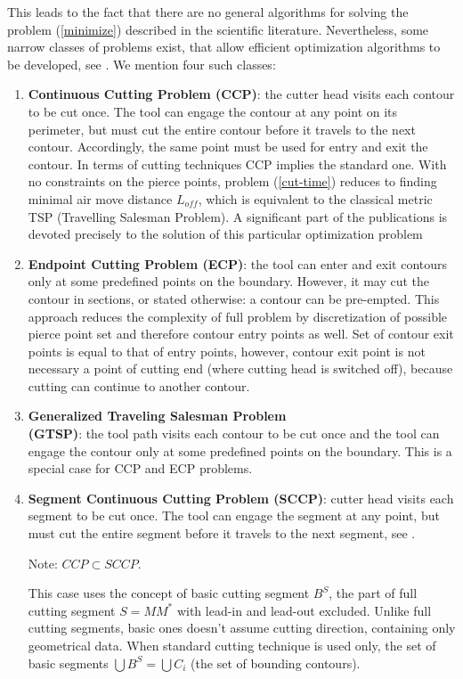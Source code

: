 \documentclass{ifacconf}
\begin{document}
This leads to the fact that
there are no general algorithms for solving the problem
(\ref{minimize})
described in the scientific literature.
Nevertheless,
some narrow classes of problems
exist,
that allow efficient optimization algorithms to be developed,
see \cite{dewil2012heuristics}.
We mention four such classes:

\begin{enumerate}
    \item \textbf{Continuous Cutting Problem (CCP)}:
    the cutter head visits each contour to be cut once.
    The tool can engage the contour at any point on its perimeter,
    but must cut the entire
    contour before it travels to the next contour.
    Accordingly, the same point must be used for
    entry and exit the contour.
    In terms of cutting techniques CCP implies the standard one.
    With no constraints on the pierce points,
    problem (\ref{cut-time}) reduces to finding minimal
    air move distance $L_{off}$,
    which is equivalent to the classical metric TSP
    (Travelling Salesman Problem).
    A significant part of the publications is devoted precisely
    to the solution of this particular optimization problem

    \item \textbf{Endpoint Cutting Problem (ECP)}:
    the tool can enter and exit contours only at some
    predefined points on the boundary.
    However, it may cut the contour in sections,
    or stated otherwise: a contour can be pre-empted.
    This approach reduces the complexity of full problem
    by discretization of possible pierce point set and therefore
    contour entry points as well.
    Set of contour exit points is equal to that of
    entry points, however,
    contour exit point is not necessary
    a point of cutting end
    (where cutting head is switched off),
    because cutting can continue to another contour.

    \item \textbf{Generalized Traveling Salesman Problem \\ (GTSP)}:
    the tool path visits each contour to be cut once
    and the tool can engage the contour only
    at some predefined points on the boundary.
    This is a special case for CCP and ECP problems.

    \item \textbf{Segment Continuous Cutting Problem (SCCP)}:
    cutter head visits each segment to be cut once.
    The tool can engage the segment at any point,
    but must cut the entire segment before it travels to the next segment,
    see \cite{Petunin2015Nov}.

    Note: $CCP \subset SCCP$.

    This case uses the concept of basic cutting segment
    $B^S$, the part of full cutting segment
    $S = MM^*$ with lead-in and lead-out excluded.
    Unlike full cutting segments,
    basic ones doesn't assume cutting direction,
    containing only geometrical data.
    When standard cutting technique is used only,
    the set of basic segments $\bigcup B^S = \bigcup C_i$
    (the set of bounding contours).

\end{enumerate}
\end{document}
